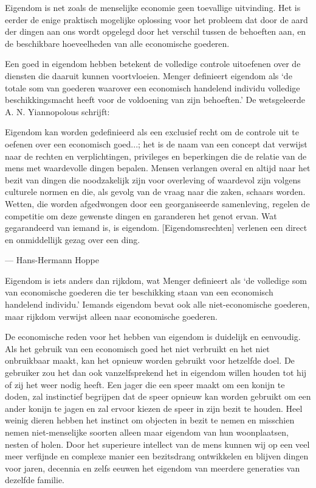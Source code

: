 \begin{blockquotebox}
    Eigendom is net zoals de menselijke economie geen toevallige uitvinding. Het is eerder de enige praktisch mogelijke oplossing voor het probleem dat door de aard der dingen aan ons wordt opgelegd door het verschil tussen de behoeften aan, en de beschikbare hoeveelheden van alle economische goederen.\footnotemark
\end{blockquotebox}


Een goed in eigendom hebben betekent de volledige controle uitoefenen over de diensten die daaruit kunnen voortvloeien. Menger definieert eigendom als `de totale som van goederen waarover een economisch handelend individu volledige beschikkingsmacht heeft voor de voldoening van zijn behoeften.'\autocite{49} De wetsgeleerde A. N. Yiannopolous schrijft:

\begin{blockquotebox}
    Eigendom kan worden gedefinieerd als een exclusief recht om de controle uit te oefenen over een economisch goed...; het is de naam van een concept dat verwijst naar de rechten en verplichtingen, privileges en beperkingen die de relatie van de mens met waardevolle dingen bepalen. Mensen verlangen overal en altijd naar het bezit van dingen die noodzakelijk zijn voor overleving of waardevol zijn volgens culturele normen en die, als gevolg van de vraag naar die zaken, schaars worden. Wetten, die worden afgedwongen door een georganiseerde samenleving, regelen de competitie om deze gewenste dingen en garanderen het genot ervan. Wat gegarandeerd van iemand is, is eigendom. [Eigendomsrechten] verlenen een direct en onmiddellijk gezag over een ding.\footnotemark
    \par\raggedleft--- Hans-Hermann Hoppe
\end{blockquotebox}

Eigendom is iets anders dan rijkdom, wat Menger definieert als `de volledige som van economische goederen die ter beschikking staan van een economisch handelend individu.'\autocite{51} Iemands eigendom bevat ook alle niet-economische goederen, maar rijkdom verwijst alleen naar economische goederen.

De economische reden voor het hebben van eigendom is duidelijk en eenvoudig. Als het gebruik van een economisch goed het niet verbruikt en het niet onbruikbaar maakt, kan het opnieuw worden gebruikt voor hetzelfde doel. De gebruiker zou het dan ook vanzelfsprekend het in eigendom willen houden tot hij of zij het weer nodig heeft. Een jager die een speer maakt om een konijn te doden, zal instinctief begrijpen dat de speer opnieuw kan worden gebruikt om een ander konijn te jagen en zal ervoor kiezen de speer in zijn bezit te houden. Heel weinig dieren hebben het instinct om objecten in bezit te nemen en misschien nemen niet-menselijke soorten alleen maar eigendom van hun woonplaatsen, nesten of holen. Door het superieure intellect van de mens kunnen wij op een veel meer verfijnde en complexe manier een bezitsdrang ontwikkelen en blijven dingen voor jaren, decennia en zelfs eeuwen het eigendom van meerdere generaties van dezelfde familie.

